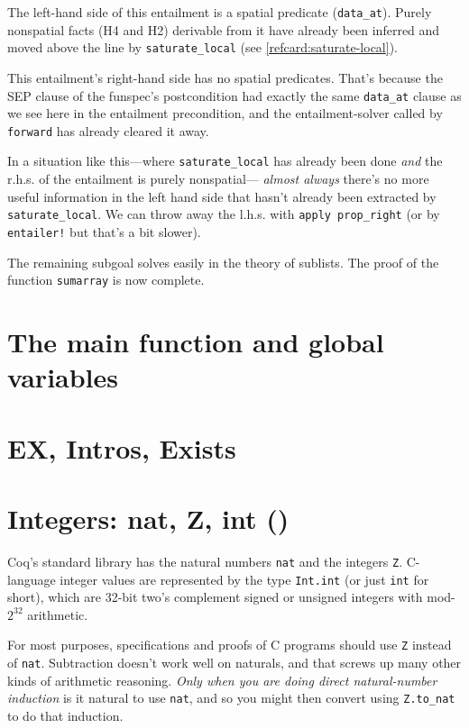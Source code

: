 \documentclass[12pt,fleqn,openany,oneside,showtrims]{memoir}
\newcommand{\ychapter}[2]{\chapter[#1]{#1 \hfill \normalsize #2}}
\begin{document}
The left-hand side of this entailment is a
spatial predicate (\lstinline{data_at}).
Purely nonspatial facts (H4 and H2) derivable from it
have already been inferred and
moved above the line by
\lstinline{saturate_local} (see \autoref{refcard:saturate-local}).

This entailment's right-hand side has no spatial
predicates.  That's because the SEP clause of the
funspec's postcondition had exactly the same
\lstinline{data_at} clause as we see here in the
entailment precondition, and the entailment-solver
called by \lstinline{forward} has already cleared it away.

In a situation like this---where
\lstinline{saturate_local} has already been done
\emph{and} the r.h.s. of the entailment is purely
nonspatial---
\emph{almost always} there's no more useful information
in the left hand side that hasn't already been
extracted by \lstinline{saturate_local}.
We can throw away the l.h.s. with
\lstinline{apply prop_right} (or by
\lstinline{entailer!} but that's a bit slower).

The remaining subgoal solves easily in the
theory of sublists.  The proof of the function
\lstinline{sumarray} is now complete.

\chapter{The \textsf{main} function and global variables}

       


\chapter{\upshape\textsf{EX, Intros, Exists}}  
\label{refcard:EX}

\ychapter{Integers: \upshape\textsf{nat, Z, int}}
{(\file{compcert/lib/Integers.v})}
\label{refcard:integers}
Coq's standard library has the natural numbers \lstinline{nat}
and the integers \lstinline{Z}.  C-language integer values
are represented by the type \lstinline{Int.int} (or just
\lstinline{int} for short), which are 32-bit two's complement
signed or unsigned integers with mod-$2^{32}$ arithmetic.

For most purposes, specifications and proofs of C programs
should use \lstinline{Z} instead of
\lstinline{nat}.  Subtraction doesn't work well on
naturals, and that screws up many other kinds of arithmetic
reasoning.  \emph{Only when you are doing direct
  natural-number induction} is it natural to use \lstinline{nat},
and so you might then convert using \lstinline{Z.to_nat}
to do that induction.
\end{document}
